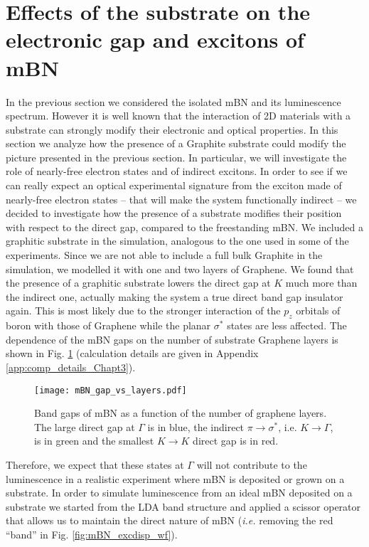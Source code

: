%
\section{Effects of the substrate on the electronic gap and excitons of mBN} \label{sec:substrate}
In the previous section we considered the isolated \acrshort{mBN} and its luminescence spectrum. However it is well known that the interaction of 2D materials with a substrate can strongly modify their electronic and optical properties. In this section we analyze how the presence of a Graphite substrate could modify the picture presented in the previous section. In particular, we will investigate the role of nearly-free electron states and of indirect excitons.
In order to see if we can really expect an optical experimental signature from the exciton made of nearly-free electron states -- that will make the system functionally indirect -- we decided to investigate how the presence of a substrate modifies their position with respect to the direct gap, compared to the freestanding mBN. We included a graphitic substrate in the simulation, analogous to the one used in some of the experiments. Since we are not able to include a full bulk Graphite in the simulation, we modelled it with one and two layers of Graphene. We found that the presence of a graphitic substrate lowers the direct gap at $K$ much more than the indirect one, actually making the system a true direct band gap insulator again. This is most likely due to the stronger interaction of the $p_z$ orbitals of boron with those of Graphene while the planar $\sigma^*$ states are less affected. The dependence of the mBN gaps on the number of substrate Graphene layers is shown in Fig. \ref{fig:mBN_gap_layers} (calculation details are given in Appendix \ref{app:comp_details_Chapt3}). 
\begin{figure}[H]
	\vspace{0.2cm}
	\setcapindent{2em}
	\centering
	\texttt{[image: mBN\_gap\_vs\_layers.pdf]}
	\caption{Band gaps of mBN as a function of the number of graphene layers\label{gap_vs_layers}. The large direct gap at $\Gamma$ is in blue, the indirect $\pi\rightarrow\sigma^*$, i.e. $K\rightarrow\Gamma$, is in green and the smallest $K\rightarrow K$ direct gap is in red.} %
	\label{fig:mBN_gap_layers}
\end{figure}
Therefore, we expect that these states at $\Gamma$ will not contribute to the luminescence in a realistic experiment where mBN is deposited or grown on a substrate.
In order to simulate luminescence from an ideal mBN deposited on a substrate we started from the LDA band structure and applied a scissor operator that allows us to maintain the direct nature of mBN (\textit{i.e.} removing the red ``band'' in Fig. \ref{fig:mBN_excdisp_wf}).\\ 



